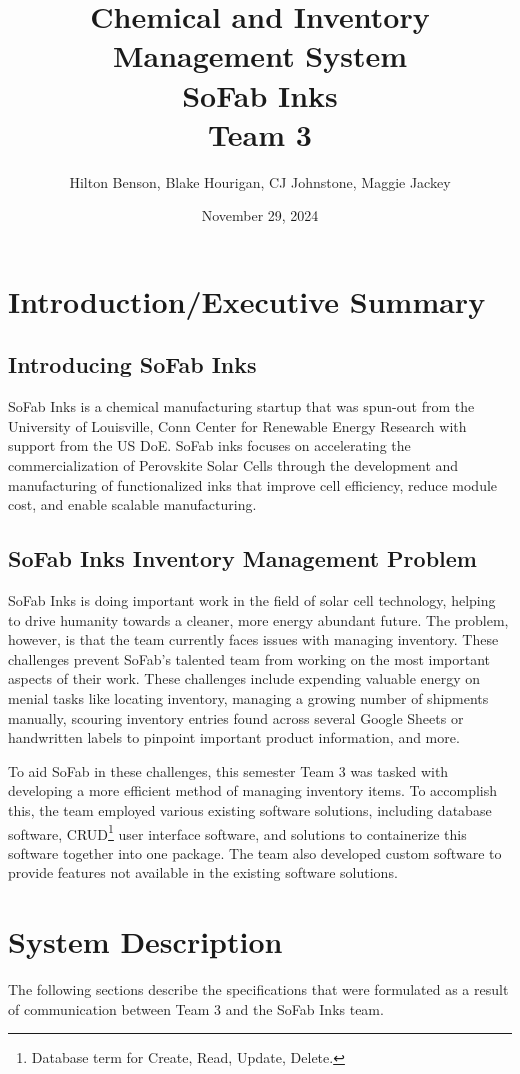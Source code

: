 \documentclass{article}
\title{Chemical and Inventory Management System \\ SoFab Inks \\ Team 3}
\date{November 29, 2024}
\author{Hilton Benson, Blake Hourigan, CJ Johnstone, Maggie Jackey}
\begin{document}
  
\maketitle
\clearpage
\tableofcontents
\clearpage

\section{Introduction\slash Executive Summary} 
\subsection{Introducing SoFab Inks}
SoFab Inks is a chemical manufacturing startup that was spun-out from the University of Louisville, Conn Center for Renewable Energy 
Research with support from the US DoE. SoFab inks focuses on accelerating the commercialization of Perovskite Solar Cells 
through the development and manufacturing of functionalized inks that improve cell efficiency, reduce module cost, and enable scalable 
manufacturing. \cite{sofabinks}
\subsection{SoFab Inks Inventory Management Problem}
SoFab Inks is doing important work in the field of solar cell technology, helping to drive humanity towards a cleaner, more energy 
abundant future. The problem, however, is that the team currently faces issues with managing inventory. These challenges prevent SoFab's
talented team from working on the most important aspects of their work. These challenges include expending valuable energy on menial 
tasks like locating inventory, managing a growing number of shipments manually, scouring inventory entries found across several 
Google Sheets or handwritten labels to pinpoint important product information, and more. 

To aid SoFab in these challenges, this semester Team 3 was tasked with developing a more efficient method of managing inventory items. 
To accomplish this, the team employed various existing software solutions, including database software, CRUD\footnote{Database term
for Create, Read, Update, Delete.} user interface software, and solutions to containerize this software together into one package. The 
team also developed custom software to provide features not available in the existing software solutions. 


\section{System Description}
The following sections describe the specifications that were formulated as a result of communication between Team 3 and the SoFab Inks
team. 
\end{document}
